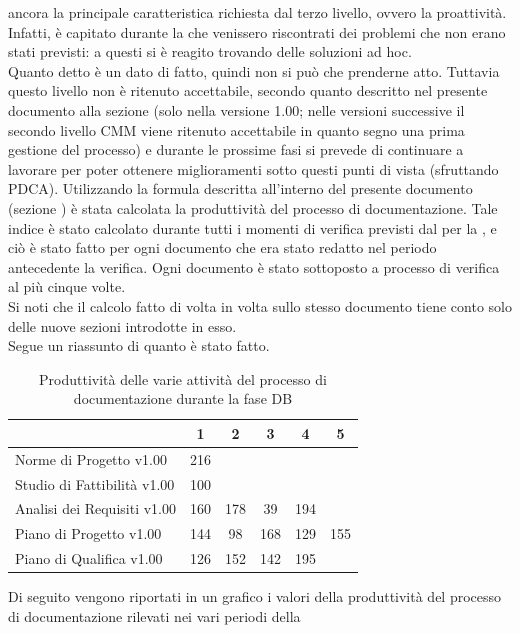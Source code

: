 				ancora la principale caratteristica richiesta dal terzo livello, ovvero la proattività. Infatti, è capitato durante la  che 
				venissero riscontrati dei problemi che non erano stati previsti: a questi si è reagito trovando delle soluzioni 
				ad hoc.\\
				Quanto detto è un dato di fatto, quindi non si può che prenderne atto. Tuttavia questo livello non è ritenuto accettabile, secondo quanto 
				descritto nel presente documento alla sezione  (solo nella versione 1.00; nelle versioni successive il secondo livello CMM viene ritenuto accettabile in quanto segno una prima gestione del processo) e durante le prossime fasi si prevede di continuare a lavorare per 
				poter ottenere miglioramenti sotto questi punti di vista (sfruttando PDCA).
				Utilizzando la formula descritta all'interno del presente documento (sezione ) è stata calcolata la produttività del 
				processo di documentazione. Tale indice è stato calcolato durante tutti i momenti di verifica previsti dal  per 
				la , e ciò è stato fatto per ogni documento che era stato redatto nel periodo antecedente la verifica. Ogni documento è stato 
				sottoposto a processo di verifica al più cinque volte.\\
				Si noti che il calcolo fatto di volta in volta sullo stesso documento tiene conto solo delle nuove sezioni introdotte in esso.\\
				Segue un riassunto di quanto è stato fatto.
				\begin{table}[H]
					\centering
					\begin{tabu}{| l | c | c | c | c | c |}
						\hline
							&1	&2	&3	&4	&5	\\ \hline
						Norme di Progetto v1.00	&216 &	&	&	& \\ \hline
						Studio di Fattibilità v1.00	&100	&	&	&	& \\ \hline
						Analisi dei Requisiti v1.00	&160	&178	&39	&194	& \\ \hline
						Piano di Progetto v1.00	&144	&98	&168	&129	&155 \\ \hline
						Piano di Qualifica v1.00	&126	&152	&142	&195	&\\ \hline
					\end{tabu}
					\caption{Produttività delle varie attività del processo di documentazione durante la fase DB}
				\end{table}
				Di seguito vengono riportati in un grafico i valori della produttività del processo di documentazione rilevati nei vari periodi della 
